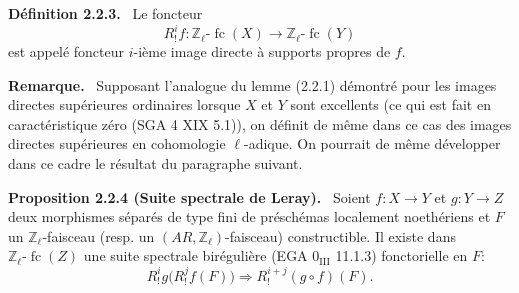 \documentclass[11pt]{article}
\newenvironment{statement}[1]{\par\medskip\noindent\textbf{#1.}\ }{\par\medskip}
\providecommand{\fc}{\operatorname{fc}}
\begin{document}
\begin{statement}{Définition 2.2.3}
Le foncteur
\[
R^i_!f:\mathbb Z_\ell\text{-}\fc(X)\longrightarrow \mathbb Z_\ell\text{-}\fc(Y)
\]
est appelé foncteur \(i\)-ième image directe à supports propres de \(f\).
\end{statement}

\begin{statement}{Remarque}
Supposant l'analogue du lemme (2.2.1) démontré pour les images directes supérieures ordinaires lorsque \(X\) et \(Y\) sont excellents (ce qui est fait en caractéristique zéro (SGA 4 XIX 5.1)), on définit de même dans ce cas des images directes supérieures en cohomologie \(\ell\)-adique. On pourrait de même développer dans ce cadre le résultat du paragraphe suivant.
\end{statement}

\begin{statement}{Proposition 2.2.4 (Suite spectrale de Leray)}
Soient \(f:X\to Y\) et \(g:Y\to Z\) deux morphismes séparés de type fini de préschémas localement noethériens et \(F\) un \(\mathbb Z_\ell\)-faisceau (resp. un \((AR,\mathbb Z_\ell)\)-faisceau) constructible. Il existe dans \(\mathbb Z_\ell\text{-}\fc(Z)\) une suite spectrale birégulière (EGA \(0_{\mathrm{III}}\) 11.1.3) fonctorielle en \(F\):
\[
R^i_!g\bigl(R^j_!f(F)\bigr)\Longrightarrow R^{i+j}_!(g\circ f)(F).
\]
\end{statement}
\end{document}
